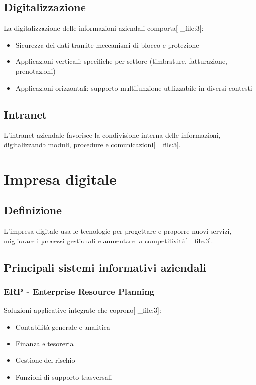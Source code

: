 \documentclass[12pt,a4paper]{article}
\begin{document}
\subsection{Digitalizzazione}
La digitalizzazione delle informazioni aziendali comporta[ _file:3]:
\begin{itemize}
    \item Sicurezza dei dati tramite meccanismi di blocco e protezione
    \item Applicazioni verticali: specifiche per settore (timbrature, fatturazione, prenotazioni)
    \item Applicazioni orizzontali: supporto multifunzione utilizzabile in diversi contesti
\end{itemize}

\subsection{Intranet}
L'intranet aziendale favorisce la condivisione interna delle informazioni, digitalizzando moduli, procedure e comunicazioni[ _file:3].

\section{Impresa digitale}

\subsection{Definizione}
L'impresa digitale usa le tecnologie per progettare e proporre nuovi servizi, migliorare i processi gestionali e aumentare la competitività[ _file:3].

\subsection{Principali sistemi informativi aziendali}

\subsubsection{ERP - Enterprise Resource Planning}
Soluzioni applicative integrate che coprono[ _file:3]:
\begin{itemize}
    \item Contabilità generale e analitica
    \item Finanza e tesoreria
    \item Gestione del rischio
    \item Funzioni di supporto trasversali
\end{itemize}
\end{document}
